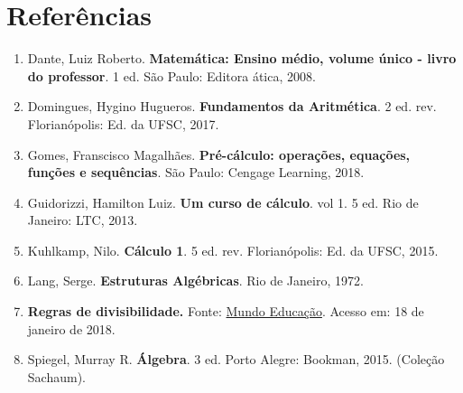 \chapter*{Referências}

 \begin{enumerate}[1.]
  \item Dante, Luiz Roberto. \textbf{Matemática: Ensino médio, volume único - livro do professor}. 1 ed. São Paulo: Editora ática, 2008.

  \item Domingues, Hygino Hugueros. \textbf{Fundamentos da Aritmética}. 2 ed. rev. Florianópolis: Ed. da UFSC, 2017.
 
  \item Gomes, Franscisco Magalhães. \textbf{Pré-cálculo: operações, equações, funções e sequências}. São Paulo: Cengage Learning, 2018.
  
  \item Guidorizzi, Hamilton Luiz. \textbf{Um curso de cálculo}. vol 1. 5 ed. Rio de Janeiro: LTC, 2013.
  
  \item Kuhlkamp, Nilo. \textbf{Cálculo 1}. 5 ed. rev. Florianópolis: Ed. da UFSC, 2015.
  
  \item Lang, Serge. \textbf{Estruturas Algébricas}. Rio de Janeiro, 1972.

  \item \textbf{Regras de divisibilidade.} Fonte: \href{http://mundoeducacao.bol.uol.com.br/matematica/regras-divisibilidade.htm}{Mundo Educação}. Acesso em: 18 de janeiro de 2018.

  \item Spiegel, Murray R. \textbf{Álgebra}. 3 ed. Porto Alegre: Bookman, 2015. (Coleção Sachaum).

 
  




  \end{enumerate}

